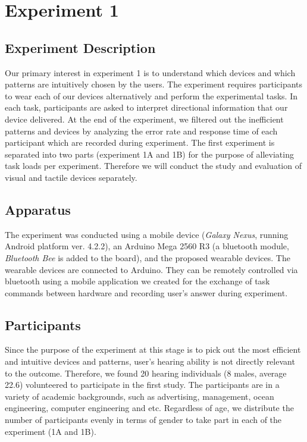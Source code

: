 \documentclass{sigchi}
\begin{document}
\section{Experiment 1}
\subsection{Experiment Description}
Our primary interest in experiment 1 is to understand which devices and which patterns are intuitively chosen by the users. The experiment requires participants to wear each of our devices alternatively and perform the experimental tasks. In each task, participants are asked to interpret directional information that our device delivered. At the end of the experiment, we filtered out the inefficient patterns and devices by analyzing the error rate and response time of each participant which are recorded during experiment. The first experiment is separated into two parts (experiment 1A and 1B) for the purpose of alleviating task loads per experiment. Therefore we will conduct the study and evaluation of visual and tactile devices separately.

\subsection{Apparatus}
The experiment was conducted using a mobile device (\textit{Galaxy Nexus}, running Android platform ver. 4.2.2), an Arduino Mega 2560 R3 (a bluetooth module, \textit{Bluetooth Bee} is added to the board), and the proposed wearable devices. The wearable devices are connected to Arduino. They can be remotely controlled via bluetooth using a mobile application we created for the exchange of task commands between hardware and recording user's answer during experiment.

\subsection{Participants}
Since the purpose of the experiment at this stage is to pick out the most efficient and intuitive devices and patterns, user’s hearing ability is not directly relevant to the outcome. Therefore, we found 20 hearing individuals (8 males, average 22.6) volunteered to participate in the first study. The participants are in a variety of academic backgrounds, such as advertising, management, ocean engineering, computer engineering and etc. Regardless of age, we distribute the number of participants evenly in terms of gender to take part in each of the experiment (1A and 1B).
\end{document}
